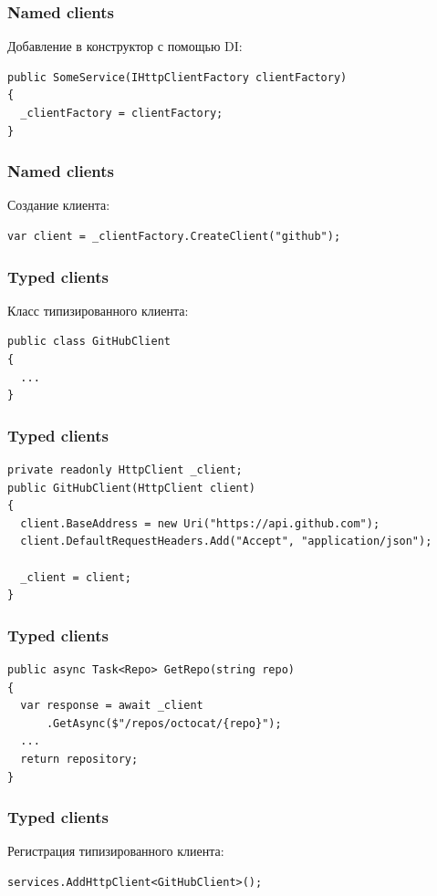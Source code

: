 \documentclass[17pt,aspectratio=169]{beamer}
\begin{document}
\begin{frame}[fragile]
\frametitle{Named clients}
Добавление в конструктор с помощью DI:
\newline
\begin{lstlisting}
public SomeService(IHttpClientFactory clientFactory)
{
  _clientFactory = clientFactory;
}
\end{lstlisting}
\end{frame}

\begin{frame}[fragile]
\frametitle{Named clients}
Создание клиента:
\newline
\begin{lstlisting}
var client = _clientFactory.CreateClient("github");
\end{lstlisting}
\end{frame}

\begin{frame}[fragile]
\frametitle{Typed clients}
Класс типизированного клиента:
\begin{lstlisting}
public class GitHubClient
{
  ...
}
\end{lstlisting}
\end{frame}

\begin{frame}[fragile]
\frametitle{Typed clients}
\begin{lstlisting}
private readonly HttpClient _client;
public GitHubClient(HttpClient client)
{
  client.BaseAddress = new Uri("https://api.github.com");
  client.DefaultRequestHeaders.Add("Accept", "application/json");

  _client = client;
}
\end{lstlisting}
\end{frame}

\begin{frame}[fragile]
\frametitle{Typed clients}
\begin{lstlisting}
public async Task<Repo> GetRepo(string repo)
{
  var response = await _client
      .GetAsync($"/repos/octocat/{repo}");
  ...
  return repository;
}
\end{lstlisting}
\end{frame}

\begin{frame}[fragile]
\frametitle{Typed clients}
Регистрация типизированного клиента:
\newline
\begin{lstlisting}
services.AddHttpClient<GitHubClient>();
\end{lstlisting}
\end{frame}
\end{document}
